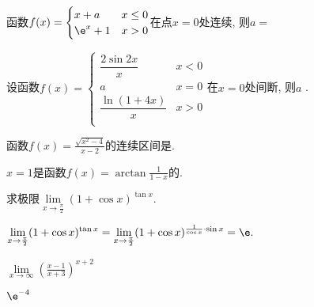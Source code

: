 \begin{problem}
	函数$f(x) =  \begin{cases}
	x + a & x \leq 0 \\
	\e^{x} + 1 & x > 0 \\
	\end{cases} $在点$x = 0$处连续, 则$a =$
	
	
\end{problem}           

\begin{problem}
	设函数$\displaystyle f(x) =  \begin{cases}
	\dfrac{2\sin 2x}{x} & x < 0 \\
	a & x = 0 \\
	\dfrac{\ln(1 + 4x)}{x} & x > 0 \\
	\end{cases}$在$x = 0$处间断, 则$a$
	.
	
\end{problem}          
%
 \begin{problem}
 	函数$\displaystyle f\left( x \right) = \frac{\sqrt{x^{2} - 4}}{x - 2}$的连续区间是.
					
\end{problem}           

\begin{problem}
	$x = 1$是函数$\displaystyle f(x) = \arctan\frac{1}{1 - x}$的.
						
\end{problem}



\begin{problem}
求极限$\lim\limits_{x \rightarrow \frac{\pi}{2}}(1 + \cos x)^{\tan x}$.

\begin{solution} $\displaystyle \lim\limits_{x \rightarrow \frac{\pi}{2}}(1 + \cos x)^{\tan x} = \displaystyle \lim\limits_{x \rightarrow \frac{\pi}{2}}(1 + \cos x)^{\frac{1}{\cos x} \cdot \sin x} = \e.$
\end{solution}

\end{problem}

\begin{problem} 
	$\displaystyle \lim\limits_{x \rightarrow \infty}\left( \frac{x - 1}{x + 3} \right)^{x + 2}$

\begin{solution}
	$\e^{- 4}$
\end{solution}


\end{problem}           

